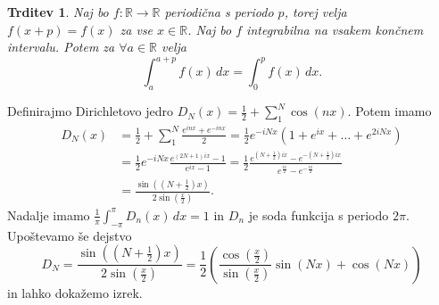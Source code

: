 \documentclass[10pt, a4paper]{article}
\newtheorem{trditev}[izr]{Trditev}
\newcommand{\R}{\mathbb {R}}
\begin{document}
\begin{trditev}
    Naj bo $f: \R \to \R$ periodična s periodo $p$, torej velja $f(x + p) = f(x)$ za vse $x \in \R$.
    Naj bo $f$ integrabilna na vsakem končnem intervalu. Potem za $\forall a \in \R$ velja
    $$\int_a ^{a + p} f(x)\, dx = \int_0 ^p f(x)\, dx.$$ 
\end{trditev}

Definirajmo Dirichletovo jedro $D_N (x) = \frac{1}{2} + \sum_1 ^N \cos (nx)$.
Potem imamo 
\begin{align*}
    D_N (x) &= \frac{1}{2} + \sum_1 ^N \frac{e^{inx} + e^{-inx}}{2}  = \frac{1}{2} e^{-iNx} (1 + e^{ix} + \dots + e^{2iNx})\\
    &= \frac{1}{2} e^{-iNx} \frac{e^{(2N + 1)ix} - 1}{e^{ix} - 1}
    = \frac{1}{2} \frac{e^{(N + \frac{1}{2})ix} - e^{-(N + \frac{1}{2})ix}}{e^{\frac{ix}{2}} -e^{-\frac{ix}{2}}}\\
    &= \frac{\sin \left(\left(N + \frac{1}{2}\right)x\right)}{2\sin \left(\frac{x}{2}\right)}.
\end{align*}
Nadalje imamo $\frac{1}{\pi} \int_{-\pi} ^\pi D_n (x)\, dx = 1$ in $D_n$ je soda funkcija s periodo $2 \pi.$
Upoštevamo še dejstvo $$D_N = \frac{\sin \left(\left(N + \frac{1}{2}\right)x\right)}{2\sin \left(\frac{x}{2}\right)} = \frac{1}{2} \left(\frac{\cos \left(\frac{x}{2}\right)}{\sin \left(\frac{x}{2}\right)} \sin(Nx) + \cos(Nx)\right)$$
in lahko dokažemo izrek. 
\end{document}
